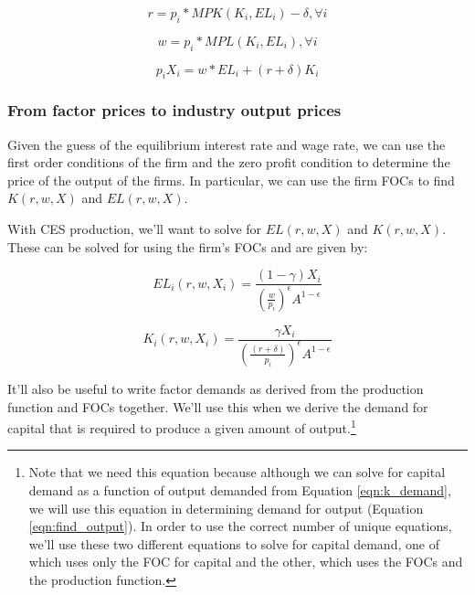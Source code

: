 \documentclass[letterpaper,12pt]{article}
\theoremstyle{definition}
\begin{document}
\begin{spacing}{1.5}
\begin{equation}
r = p_{i}*MPK(K_{i},EL_{i}) - \delta, \forall i
\end{equation}

\begin{equation}
w = p_{i}*MPL(K_{i},EL_{i}), \forall i
\end{equation}

\begin{equation}
p_{i}X_{i}= w*EL_{i} + (r+\delta)K_{i}
\end{equation}
 
 
\subsubsection*{From factor prices to industry output prices}

Given the guess of the equilibrium interest rate and wage rate, we can use the first order conditions of the firm and the zero profit condition to determine the price of the output of the firms.  In particular, we can use the firm FOCs to find $K(r,w,X)$ and $EL(r,w,X)$.  

With CES production, we'll want to solve for $EL(r,w,X)$ and $K(r,w,X)$.  These can be solved for using the firm's FOCs and are given by:

\begin{equation}
\label{eqn:l_demand}
EL_{i}(r,w,X_{i})=\frac{(1-\gamma)X_{i}}{\left(\frac{w}{p_{i}}\right)^{\epsilon}A^{1-\epsilon}}
\end{equation}



\begin{equation}
\label{eqn:k_demand}
K_{i}(r,w,X_{i})=\frac{\gamma X_{i}}{\left(\frac{(r+\delta)}{p_{i}}\right)^{\epsilon}A^{1-\epsilon}}
\end{equation}


It'll also be useful to write factor demands as derived from the production function and FOCs together.  We'll use this when we derive the demand for capital that is required to produce a given amount of output.\footnote{Note that we need this equation because although we can solve for capital demand as a function of output demanded from Equation \ref{eqn:k_demand}, we will use this equation in determining demand for output (Equation \ref{eqn:find_output}).  In order to use the correct number of unique equations, we'll use these two different equations to solve for capital demand, one of which uses only the FOC for capital and the other, which uses the FOCs and the production function.} 


\end{spacing}
\end{document}
